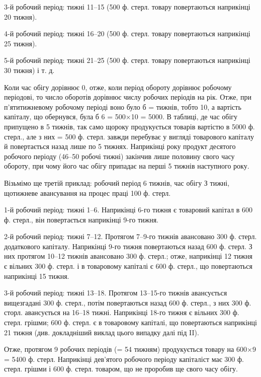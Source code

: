 3-й робочий період: тижні 11--15 (500 ф. стерл. товару повертаються
наприкінці 20 тижня).

4-й робочий період: тижні 16--20 (500 ф. стерл. товару повертаються
наприкінці 25 тижня).

5-й робочий період: тижні 21--25 (500 ф. стерл. товару повертаються
наприкінці 30 тижня) і т. д.

Коли час обігу дорівнює 0, отже, коли період обороту дорівнює
робочому періодові, то число оборотів дорівнює числу робочих періодів
на рік.
Отже, при п’ятитижневому робочому періоді воно було б = 
тижнів, тобто 10, а вартість капіталу, що обернувся, була б 6 = 500×10 =
5000.
В таблиці, де час обігу припущено в 5 тижнів, так само щороку
продукується товарів вартістю в 5000 ф. стерл., але з них  = 500 ф.
стерл. завжди перебуває у вигляді товарового капіталу й повертається
назад лише по 5 тижнях. Наприкінці року продукт десятого робочого
періоду (46--50 робочі тижні) закінчив лише половину свого часу
обороту, при чому його час обігу припадає на перші 5 тижнів наступного року.

Візьмімо ще третій приклад: робочий період 6 тижнів, час обігу
З тижні, щотижневе авансування на процес праці 100 ф. стерл.

1-й робочий період: тижні 1--6. Наприкінці 6-го тижня є товаровий
капітал в 600 ф. стерл., він повертається наприкінці 9-го тижня.

2-й робочий період: тижні 7--12. Протягом 7--9-го тижнів авансовано
300 ф. стерл. додаткового капіталу. Наприкінці 9-го тижня повертаються
назад 600 ф. стерл. З них протягом 10--12 тижнів авансовано 300 ф.
стерл.; отже, наприкінці 12 тижня є вільних 300 ф. стерл. і в товаровому
капіталі є 600 ф. стерл., що повертаються наприкінці 15 тижня.

3-й робочий період: тижні 13--18. Протягом 13--15-го тижнів авансується
вищезгадані 300 ф. стерл., потім повертаються назад 600 ф. стерл.,
з них 300 ф. сторл. авансується на 16--18 тижні. Наприкінці 18-го тижня
є вільних 300 ф. стерл. грішми; 600 ф. стерл. є в товаровому капіталі,
що повертаються наприкінці 21 тижня (див. докладніший виклад
цього випадку далі під II).

Отже, протягом 9 робочих періодів (= 54 тижням) продукується товару
на 600×9 = 5400 ф. стерл. Наприкінці дев’ятого робочого періоду
капіталіст має 300 ф. стерл. грішми і 600 ф. стерл. товаром, що не
проробив ще свого часу обігу.

